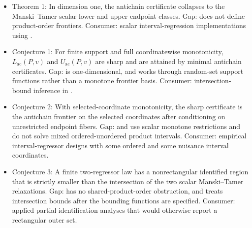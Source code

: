 \documentclass[11pt]{article}
\theoremstyle{definition}
\theoremstyle{plain}
\theoremstyle{remark}
\begin{document}
\begin{itemize}[leftmargin=2em]
\item Theorem 1: In dimension one, the antichain certificate collapses to the Manski--Tamer scalar lower and upper endpoint classes. Gap: \citet{ManskiTamer2002IntervalRegression} does not define product-order frontiers. Consumer: scalar interval-regression implementations using \citet{ManskiTamer2002IntervalRegression}.
\item Conjecture 1: For finite support and full coordinatewise monotonicity, \(L_{\mathrm{ac}}(P,v)\) and \(U_{\mathrm{ac}}(P,v)\) are sharp and are attained by minimal antichain certificates. Gap: \citet{ManskiTamer2002IntervalRegression} is one-dimensional, and \citet{BeresteanuMolchanovMolinari2011ConvexMomentPredictions} works through random-set support functions rather than a monotone frontier basis. Consumer: intersection-bound inference in \citet{ChernozhukovLeeRosen2013IntersectionBounds}.
\item Conjecture 2: With selected-coordinate monotonicity, the sharp certificate is the antichain frontier on the selected coordinates after conditioning on unrestricted endpoint fibers. Gap: \citet{ManskiPepper2000MIV} and \citet{MagnacMaurin2008MonotoneBinaryInterval} use scalar monotone restrictions and do not solve mixed ordered-unordered product intervals. Consumer: empirical interval-regressor designs with some ordered and some nuisance interval coordinates.
\item Conjecture 3: A finite two-regressor law has a nonrectangular identified region that is strictly smaller than the intersection of the two scalar Manski--Tamer relaxations. Gap: \citet{ManskiTamer2002IntervalRegression} has no shared-product-order obstruction, and \citet{ChernozhukovLeeRosen2013IntersectionBounds} treats intersection bounds after the bounding functions are specified. Consumer: applied partial-identification analyses that would otherwise report a rectangular outer set.
\end{itemize}
\end{document}
